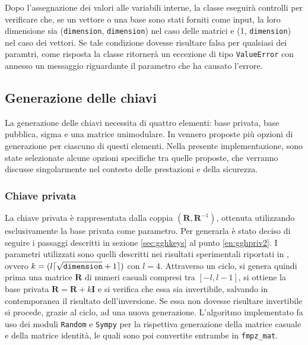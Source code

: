 Dopo l'assegnazione dei valori alle variabili interne, la classe eseguirà controlli 
per verificare che, se un vettore o una base sono stati forniti come input, la loro 
dimensione sia (\texttt{dimension}, \texttt{dimension})
nel caso delle matrici e (1, \texttt{dimension}) nel caso dei vettori. Se tale condizione
dovesse risultare falsa per qualsiasi dei paramtri, come risposta la classe ritornerà
un eccezione di tipo \texttt{ValueError} con annesso un messaggio riguardante il parametro
che ha causato l'errore.

\subsection{Generazione delle chiavi}

La generazione delle chiavi necessita di quattro elementi: base privata, base pubblica, sigma
e una matrice unimodulare. In \cite{GGH97} vennero proposte più opzioni di generazione
per ciascuno di questi elementi. Nella presente implementazione, sono state selezionate 
alcune opzioni specifiche tra quelle proposte, che verranno discusse singolarmente nel contesto
delle prestazioni e della sicurezza.

\subsubsection{Chiave privata}
La chiave privata è rappresentata dalla coppia $(\mathbf{R}, \mathbf{R}^{-1})$,
ottenuta utilizzando esclusivamente la base privata come parametro.
Per generarla è stato deciso di seguire i passaggi descritti 
in sezione \ref{sec:gghkeys} al punto \ref{en:gghpriv2}. I parametri utilizzati sono
quelli descritti nei risultati sperimentali riportati in \cite{GGH97}, ovvero 
$k = (l \lceil \sqrt{\text{\texttt{dimension}}} + 1 \rceil)$ con $l = 4$. 
Attraverso un ciclo, si genera quindi prima una matrice $\mathbf{R}$ di numeri casuali 
compresi tra $[-l, l-1]$, si ottiene la base privata $\mathbf{R} = \mathbf{R}+k\mathbf{I}$ 
e si verifica che essa sia invertibile, salvando in contemporanea il risultato dell'inversione.
Se essa non dovesse risultare invertibile si procede, grazie al ciclo, ad una nuova generazione. 
L'algoritmo implementato fa uso dei moduli \texttt{Random} e \texttt{Sympy} per la rispettiva
generazione della matrice casuale e della matrice identità, le quali sono poi convertite
entrambe in \texttt{fmpz\_mat}. 

